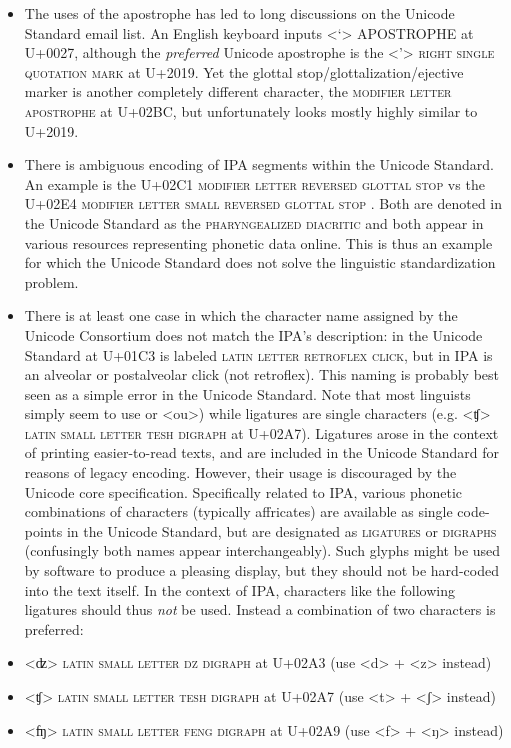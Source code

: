 \begin{itemize}
	\item The uses of the apostrophe has led to long discussions on the
	Unicode Standard email list. An English keyboard inputs
	\textless{}`\textgreater{} APOSTROPHE at U+0027, although the
	\textit{preferred} Unicode apostrophe is the \textless{}'\textgreater{}
	\textsc{right single quotation mark} at U+2019. Yet the glottal
	stop/glottalization/ejective marker is another completely different
	character, the \textsc{modifier letter apostrophe} at U+02BC, but
	unfortunately looks mostly highly similar to U+2019.  \item There is
	ambiguous encoding of IPA segments within the Unicode Standard. An
	example is the U+02C1 \textsc{modifier letter reversed glottal stop} vs
	the U+02E4 \textsc{modifier letter small reversed glottal stop} . Both
	are denoted in the Unicode Standard as the \textsc{pharyngealized
	diacritic} and both appear in various resources representing phonetic
	data online. This is thus an example for which the Unicode Standard does
	not solve the linguistic standardization problem.  \item There is at
	least one case in which the character name assigned by the Unicode
	Consortium does not match the IPA's description: in the Unicode Standard
	at U+01C3 is labeled \textsc{latin letter retroflex click}, but in IPA
	is an alveolar or postalveolar click (not retroflex). This naming is
	probably best seen as a simple error in the Unicode Standard. Note that
	most linguists simply seem to use or <ou>) while ligatures are single
	characters (e.g. <ʧ> \textsc{latin small letter tesh digraph} at
	U+02A7). Ligatures arose in the context of printing easier-to-read
	texts, and are included in the Unicode Standard for reasons of legacy
	encoding. However, their usage is discouraged by the Unicode core
	specification. Specifically related to IPA, various phonetic
	combinations of characters (typically affricates) are available as
	single code-points in the Unicode Standard, but are designated as
	\textsc{ligatures} or \textsc{digraphs} (confusingly both names appear
	interchangeably). Such glyphs might be used by software to produce a
	pleasing display, but they should not be hard-coded into the text
	itself. In the context of IPA, characters like the following ligatures
	should thus \emph{not} be used. Instead a combination of two characters
	is preferred: \item <ʣ> \textsc{latin small letter dz digraph} at U+02A3
	(use <d> + <z> instead) \item <ʧ> \textsc{latin small letter tesh
	digraph} at U+02A7 (use <t> + <ʃ> instead) \item <ʩ> \textsc{latin small
	letter feng digraph} at U+02A9 (use <f> + <ŋ> instead)
\end{itemize}

